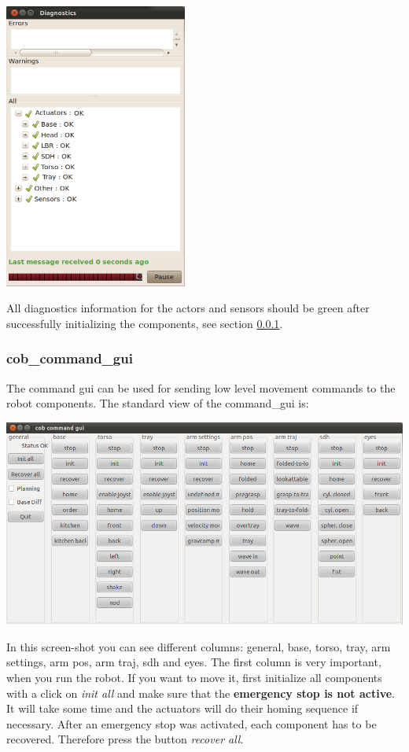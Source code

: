 \begin{center}
\includegraphics[width=0.45\textwidth]{images/diagnostics.png}
\end{center}

All diagnostics information for the actors and sensors should be green after successfully initializing the components, see section \ref{subsec:command_gui}.

\subsubsection{cob\_command\_gui}\label{subsec:command_gui}
The command gui can be used for sending low level movement commands to the robot components. The standard view of the command\_gui is:
\begin{center}
 \includegraphics[width=1\textwidth]{images/cob_command_gui.png}
\end{center}

In this screen-shot you can see different columns: general, base, torso, tray, arm settings, arm pos, arm traj, sdh and eyes. The first column is very important, when you run the robot. If you want to move it, first initialize all components with a click on \textit{init all} and make sure that the \textbf{emergency stop is not active}. It will take some time and the actuators will do their homing sequence if necessary. After an emergency stop was activated, each component has to be recovered. Therefore press the button \textit{recover all}. 

